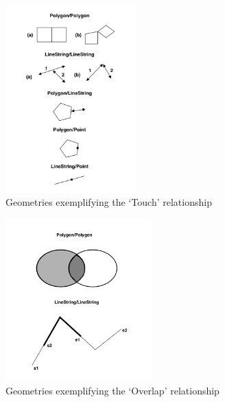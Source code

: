\begin{figure}
    \centering

    \includegraphics[width=0.45\textwidth]{figures/touches.png}
    
    \caption{Geometries exemplifying the `Touch' relationship}
    \label{fig:touches}
    
\end{figure}

\begin{figure}
    \centering

    \includegraphics[width=0.5\textwidth]{figures/overlap.png}
    
    \caption{Geometries exemplifying the `Overlap' relationship}
    \label{fig:overlap}
    
\end{figure}

